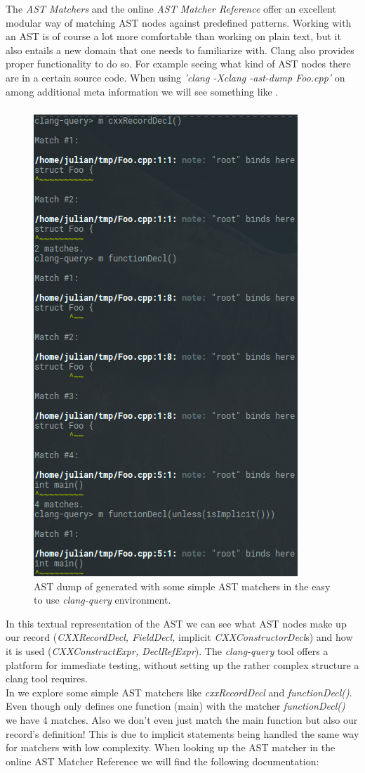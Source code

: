 The \textit{AST Matchers} and the online \textit{AST Matcher Reference} offer an excellent modular way of matching AST nodes against predefined patterns. Working with an AST is of course a lot more comfortable than working on plain text, but it also entails a new domain that one needs to familiarize with. Clang also provides proper functionality to do so. For example seeing what kind of AST nodes there are in a certain source code. When using \textit{'clang -Xclang -ast-dump Foo.cpp'} on  among additional meta information we will see something like .
\vspace{-0.9cm}
\subsubsection{}
\begin{figure}
	\centering
	\vspace{-20pt}
	\includegraphics[width=\linewidth, height=0.7\textwidth]{PICs/clang_query_foo_code}
	\caption{AST dump of  generated with some simple AST matchers in the easy to use \textit{clang-query} environment.}\label{foo_code_clang_query}
\end{figure}In this textual representation of the AST we can see what AST nodes make up our record (\textit{CXXRecordDecl, FieldDecl,} implicit \textit{CXXConstructorDecl}s) and how it is used (\textit{CXXConstructExpr, DeclRefExpr}). The \textit{clang-query} tool  offers a platform for immediate testing, without setting up the rather complex structure a clang tool requires.\\
In  we explore some simple AST matchers like \textit{cxxRecordDecl} and \textit{functionDecl()}. Even though  only defines one function (main) with the matcher \textit{functionDecl()} we have 4 matches. Also we don't even just match the main function but also our record's definition! This is due to implicit statements being handled the same way for matchers with low complexity. When looking up the AST matcher in the online AST Matcher Reference we will find the following documentation:\newline
